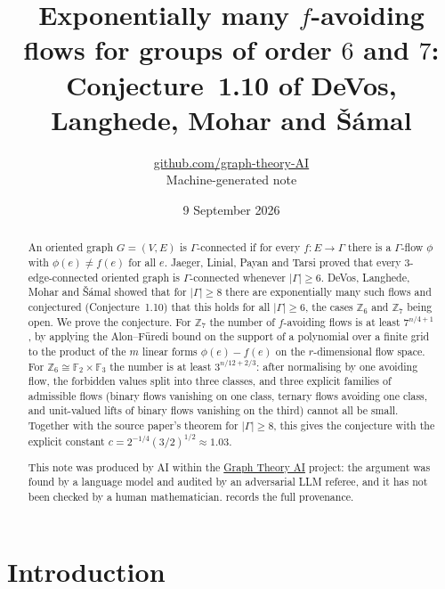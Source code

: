 \documentclass[11pt,a4paper]{article}
\title{Exponentially many $f$-avoiding flows for groups of order $6$ and $7$:\\ Conjecture~1.10 of DeVos, Langhede, Mohar and Šámal}
\author{\href{https://github.com/graph-theory-AI}{github.com/graph-theory-AI}\\[2pt] \normalsize Machine-generated note}
\date{9 September 2026}
\theoremstyle{plain}
\theoremstyle{definition}
\theoremstyle{remark}
\newcommand{\F}{{\mathbb F}}
\newcommand{\Z}{{\mathbb Z}}
\begin{document}
\maketitle


\begin{abstract}
An oriented graph $G=(V,E)$ is $\Gamma$-connected if for every $f\colon E\to\Gamma$ there is a $\Gamma$-flow $\phi$ with $\phi(e)\ne f(e)$ for all $e$. Jaeger, Linial, Payan and Tarsi proved that every $3$-edge-connected oriented graph is $\Gamma$-connected whenever $|\Gamma|\ge6$. DeVos, Langhede, Mohar and Šámal showed that for $|\Gamma|\ge8$ there are exponentially many such flows and conjectured (Conjecture~1.10) that this holds for all $|\Gamma|\ge6$, the cases $\Z_6$ and $\Z_7$ being open. We prove the conjecture. For $\Z_7$ the number of $f$-avoiding flows is at least $7^{n/4+1}$, by applying the Alon--Füredi bound on the support of a polynomial over a finite grid to the product of the $m$ linear forms $\phi(e)-f(e)$ on the $r$-dimensional flow space. For $\Z_6\cong\F_2\times\F_3$ the number is at least $3^{n/12+2/3}$: after normalising by one avoiding flow, the forbidden values split into three classes, and three explicit families of admissible flows (binary flows vanishing on one class, ternary flows avoiding one class, and unit-valued lifts of binary flows vanishing on the third) cannot all be small. Together with the source paper's theorem for $|\Gamma|\ge8$, this gives the conjecture with the explicit constant $c=2^{-1/4}(3/2)^{1/2}\approx1.03$.

\medskip\noindent\small
This note was produced by AI within the \href{https://github.com/graph-theory-AI/Graph-Theory-LLM-Proofs}{Graph Theory AI} project:
the argument was found by a language model and audited by an adversarial LLM
referee, and it has not been checked by a human mathematician.
 records the full provenance.

\end{abstract}

\section{Introduction}\label{sec:intro}
\end{document}
